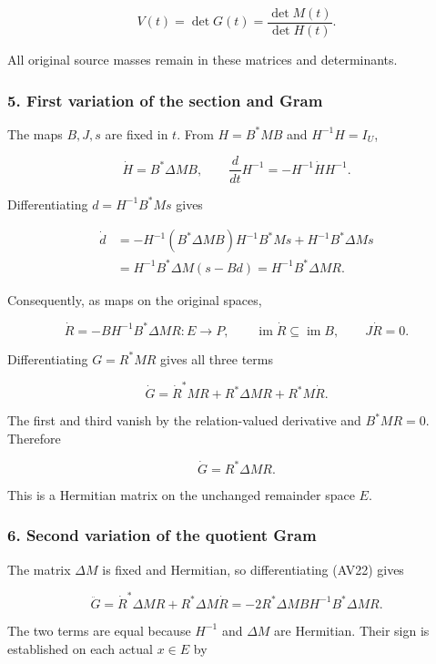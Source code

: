 \[
V(t)=\det G(t)=\frac{\det M(t)}{\det H(t)}.
\tag{AV17}
\]

All original source masses remain in these matrices and determinants.

\subsubsection{5. First variation of the section and Gram}\label{endpoint-variation_review--first-variation-of-the-section-and-gram}

The maps \(B,J,s\) are fixed in \(t\). From \(H=B^*MB\) and \(H^{-1}H=I_U\),

\[
\dot H=B^*\Delta M B,\qquad
\frac{d}{dt}H^{-1}=-H^{-1}\dot H H^{-1}.
\tag{AV18}
\]

Differentiating \(d=H^{-1}B^*Ms\) gives

\[
\begin{aligned}
\dot d
&=-H^{-1}(B^*\Delta M B)H^{-1}B^*Ms+H^{-1}B^*\Delta M s\\
&=H^{-1}B^*\Delta M(s-Bd)
=H^{-1}B^*\Delta M R.
\end{aligned}
\tag{AV19}
\]

Consequently, as maps on the original spaces,

\[
\dot R=-BH^{-1}B^*\Delta M R:E\longrightarrow P,\qquad
\operatorname{im}\dot R\subseteq\operatorname{im}B,\qquad J\dot R=0.
\tag{AV20}
\]

Differentiating \(G=R^*MR\) gives all three terms

\[
\dot G=\dot R^*MR+R^*\Delta M R+R^*M\dot R.
\tag{AV21}
\]

The first and third vanish by the relation-valued derivative and \(B^*MR=0\). Therefore

\[
\dot G=R^*\Delta M R.
\tag{AV22}
\]

This is a Hermitian matrix on the unchanged remainder space \(E\).

\subsubsection{6. Second variation of the quotient Gram}\label{endpoint-variation_review--second-variation-of-the-quotient-gram}

The matrix \(\Delta M\) is fixed and Hermitian, so differentiating (AV22) gives

\[
\ddot G=\dot R^*\Delta M R+R^*\Delta M\dot R
=-2R^*\Delta M BH^{-1}B^*\Delta M R.
\tag{AV23}
\]

The two terms are equal because \(H^{-1}\) and \(\Delta M\) are Hermitian. Their sign is established on each actual \(x\in E\) by

